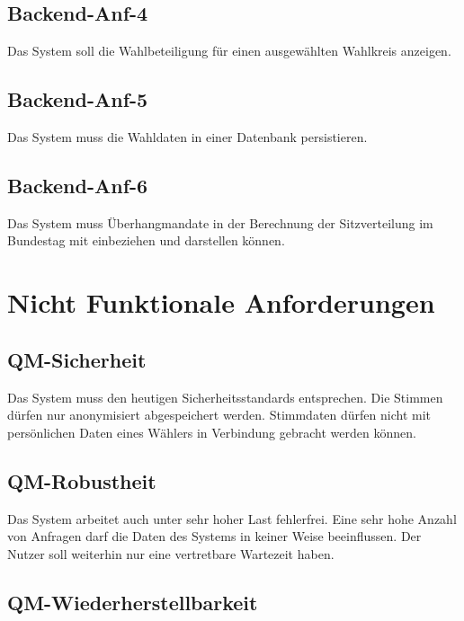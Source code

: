 \documentclass[a4paper]{scrreprt}
\begin{document}
\subsection{Backend-Anf-4}

Das System soll die Wahlbeteiligung für einen ausgewählten Wahlkreis anzeigen. \\

\subsection{Backend-Anf-5}

Das System muss die Wahldaten in einer Datenbank persistieren. \\

\subsection{Backend-Anf-6}

Das System muss Überhangmandate in der Berechnung der Sitzverteilung im Bundestag mit einbeziehen und darstellen können. \\

\section{Nicht Funktionale Anforderungen}

\subsection{QM-Sicherheit}

Das System muss den heutigen Sicherheitsstandards entsprechen. Die Stimmen dürfen nur anonymisiert abgespeichert werden. Stimmdaten dürfen nicht mit persönlichen Daten eines Wählers in Verbindung gebracht werden können.

\subsection{QM-Robustheit}

Das System arbeitet auch unter sehr hoher Last fehlerfrei. Eine sehr hohe Anzahl von Anfragen darf die Daten des Systems in keiner Weise beeinflussen. Der Nutzer soll weiterhin nur eine vertretbare Wartezeit haben.

\subsection{QM-Wiederherstellbarkeit}
\end{document}
